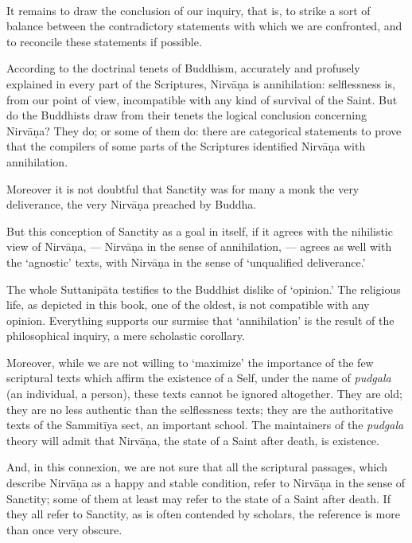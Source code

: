 \documentclass[a4paper, 11pt, oneside, english, landscape]{article}
\begin{document}
\paragraph{}
It remains to draw the conclusion of our inquiry, that is, to strike a sort of balance between the contradictory statements with which we are confronted, and to reconcile these statements if possible.

According to the doctrinal tenets of Buddhism, accurately and profusely explained in every part of the Scriptures, Nirvāṇa is annihilation: selflessness is, from our point of view, incompatible with any kind of survival of the Saint. But do the Buddhists draw from their tenets the logical conclusion concerning Nirvāṇa? They do; or some of them do: there are categorical statements to prove that the compilers of some parts of the Scriptures identified Nirvāṇa with annihilation.

Moreover it is not doubtful that Sanctity was for many a monk the very deliverance, the very Nirvāṇa preached by Buddha.

But this conception of Sanctity as a goal in itself, if it agrees with the nihilistic view of Nirvāṇa, --- Nirvāṇa in the sense of annihilation, --- agrees as well with the `agnostic' texts, with Nirvāṇa in the sense of `unqualified deliverance.'

The whole Suttanipāta testifies to the Buddhist dislike of `opinion.' The religious life, as depicted in this book, one of the oldest, is not compatible with any opinion. Everything supports our surmise that `annihilation' is the result of the philosophical inquiry, a mere scholastic corollary.

Moreover, while we are not willing to `maximize' the importance of the few scriptural texts which affirm the existence of a Self, under the name of \emph{pudgala} (an individual, a person), these texts cannot be ignored altogether. They are old; they are no less authentic than the selflessness texts; they are the authoritative texts of the Sammitīya sect, an important school. The maintainers of the \emph{pudgala} theory will admit that Nirvāṇa, the state of a Saint after death, is existence.

And, in this connexion, we are not sure that all the scriptural passages, which describe Nirvāṇa as a happy and stable condition, refer to Nirvāṇa in the sense of Sanctity; some of them at least may refer to the state of a Saint after death. If they all refer to Sanctity, as is often contended by scholars, the reference is more than once very obscure.
\end{document}
